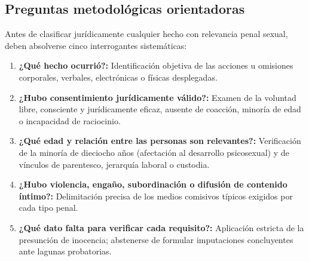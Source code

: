 \documentclass[spanish,letterpaper,oneside]{article}
\begin{document}
\subsection*{Preguntas metodológicas orientadoras}
Antes de clasificar jurídicamente cualquier hecho con relevancia penal sexual, deben absolverse cinco interrogantes sistemáticas:
\begin{enumerate}[leftmargin=*,topsep=2pt,itemsep=1pt]
\item \textbf{¿Qué hecho ocurrió?:} Identificación objetiva de las acciones u omisiones corporales, verbales, electrónicas o físicas desplegadas.
\item \textbf{¿Hubo consentimiento jurídicamente válido?:} Examen de la voluntad libre, consciente y jurídicamente eficaz, ausente de coacción, minoría de edad o incapacidad de raciocinio.
\item \textbf{¿Qué edad y relación entre las personas son relevantes?:} Verificación de la minoría de dieciocho años (afectación al desarrollo psicosexual) y de vínculos de parentesco, jerarquía laboral o custodia.
\item \textbf{¿Hubo violencia, engaño, subordinación o difusión de contenido íntimo?:} Delimitación precisa de los medios comisivos típicos exigidos por cada tipo penal.
\item \textbf{¿Qué dato falta para verificar cada requisito?:} Aplicación estricta de la presunción de inocencia; abstenerse de formular imputaciones concluyentes ante lagunas probatorias.
\end{enumerate}
\end{document}

